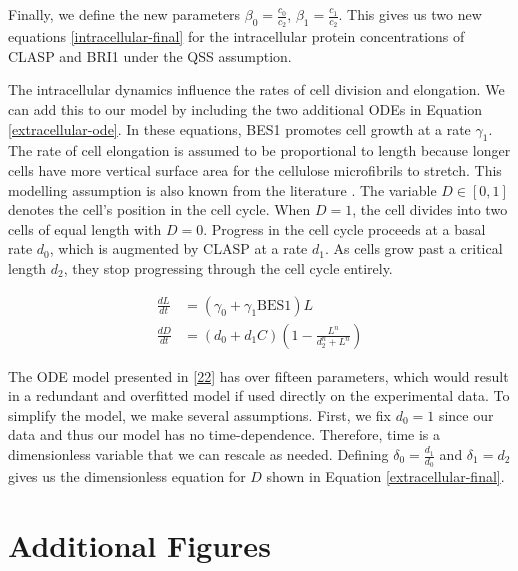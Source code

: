 \documentclass[referee,pdflatex,sn-mathphys-num]{sn-jnl}
\begin{document}
\begin{appendices}
Finally, we define the new parameters $\beta_{0} = \frac{c_{0}}{c_{2}}$, $\beta_{1} = \frac{c_{1}}{c_{2}}$.
This gives us two new equations \eqref{intracellular-final} for the intracellular protein concentrations of CLASP and BRI1 under the QSS assumption.

The intracellular dynamics influence the rates of cell division and elongation.
We can add this to our model by including the two additional ODEs in Equation \eqref{extracellular-ode}.
In these equations, BES1 promotes cell growth at a rate $\gamma_{1}$.
The rate of cell elongation is assumed to be proportional to length because longer cells have more vertical surface area for the cellulose microfibrils to stretch.
This modelling assumption is also known from the literature \cite{lockhart1965, smithers2024}.
The variable $D \in [0, 1]$ denotes the cell's position in the cell cycle.
When $D = 1$, the cell divides into two cells of equal length with $D = 0$.
Progress in the cell cycle proceeds at a basal rate $d_{0}$, which is augmented by CLASP at a rate $d_{1}$.
As cells grow past a critical length $d_{2}$, they stop progressing through the cell cycle entirely. 

\begin{equation}
\label{extracellular-ode}
\begin{aligned}
  \frac{ dL }{ dt } &= \left(\gamma_{0} + \gamma_{1}\text{BES1}\right)L  \\[5pt]
\frac{ dD }{ dt } &= (d_{0} + d_{1}C)\left( 1 - \frac{ L^{ n } }{ d_{2}^{ n } + L^{ n } } \right) 
\end{aligned}
\end{equation}

The ODE model presented in \ref{22} has over fifteen parameters, which would result in a redundant and overfitted model if used directly on the experimental data.
To simplify the model, we make several assumptions.
First, we fix $d_{0} = 1$ since our data and thus our model has no time-dependence.
Therefore, time is a dimensionless variable that we can rescale as needed.
Defining $\delta_{0} = \frac{d_{1}}{d_{0}}$ and $\delta_{1} = d_{2}$ gives us the dimensionless equation for $D$ shown in Equation \eqref{extracellular-final}.


\section{Additional Figures}\label{secA3}


\end{appendices}
\end{document}
